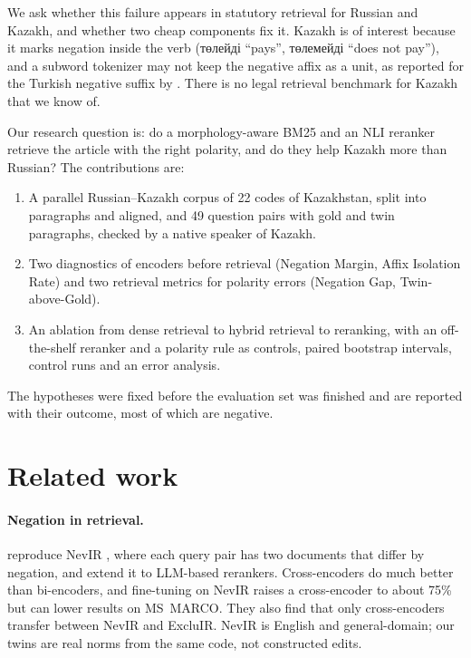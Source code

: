 \documentclass[11pt]{article}
\newcommand{\ru}[1]{#1}
\begin{document}
We ask whether this failure appears in statutory retrieval for Russian and Kazakh, and whether two cheap
components fix it. Kazakh is of interest because it marks negation inside the verb (\ru{төлейді} ``pays'',
\ru{төлемейді} ``does not pay''), and a subword tokenizer may not keep the negative affix as a unit, as
reported for the Turkish negative suffix by \citet{toraman2023tokenization}. There is no legal retrieval
benchmark for Kazakh that we know of.

Our research question is: do a morphology-aware BM25 and an NLI reranker retrieve the article with the right
polarity, and do they help Kazakh more than Russian? The contributions are:

\begin{enumerate}
\item A parallel Russian--Kazakh corpus of 22 codes of Kazakhstan, split into paragraphs and aligned, and 49
question pairs with gold and twin paragraphs, checked by a native speaker of Kazakh.
\item Two diagnostics of encoders before retrieval (Negation Margin, Affix Isolation Rate) and two
retrieval metrics for polarity errors (Negation Gap, Twin-above-Gold).
\item An ablation from dense retrieval to hybrid retrieval to reranking, with an off-the-shelf reranker and a
polarity rule as controls, paired bootstrap intervals, control runs and an error analysis.
\end{enumerate}

The hypotheses were fixed before the evaluation set was finished and are reported with their outcome, most
of which are negative.

\section{Related work}

\paragraph{Negation in retrieval.} \citet{vandenelsen2025nevir} reproduce NevIR \citep{weller-etal-2024-nevir}, where each query pair has
two documents that differ by negation, and extend it to LLM-based rerankers. Cross-encoders do much better
than bi-encoders, and fine-tuning on NevIR raises a cross-encoder to about 75\% but can lower results on
MS~MARCO. They also find that only cross-encoders transfer between NevIR and ExcluIR. NevIR is English and
general-domain; our twins are real norms from the same code, not constructed edits.
\end{document}
